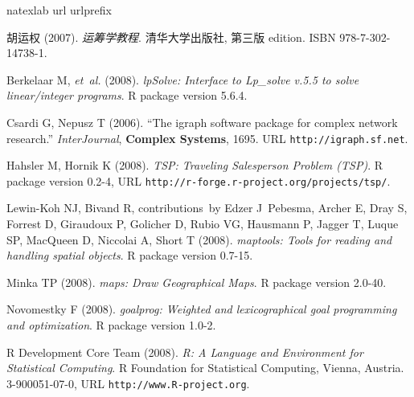 \documentclass{article}
\begin{document}
\begin{thebibliography}{20}
\newcommand{\enquote}[1]{``#1''}
\expandafter\ifx\csname natexlab\endcsname\relax\def\natexlab#1{#1}\fi
\expandafter\ifx\csname url\endcsname\relax
  \def\url#1{\texttt{#1}}\fi
\expandafter\ifx\csname urlprefix\endcsname\relax\def\urlprefix{URL }\fi
\providecommand{\eprint}[2][]{\url{#2}}

胡运权 (2007).
\newblock \emph{运筹学教程}.
\newblock 清华大学出版社, 第三版 edition.
\newblock ISBN 978-7-302-14738-1.

Berkelaar M, \emph{et~al.} (2008).
\newblock \emph{lpSolve: Interface to Lp\_solve v.5.5 to solve linear/integer
  programs}.
\newblock R package version 5.6.4.

Csardi G, Nepusz T (2006).
\newblock \enquote{The igraph software package for complex network research.}
\newblock \emph{InterJournal}, \textbf{Complex Systems}, 1695.
\newblock \urlprefix\url{http://igraph.sf.net}.

Hahsler M, Hornik K (2008).
\newblock \emph{TSP: Traveling Salesperson Problem (TSP)}.
\newblock R package version 0.2-4,
  \urlprefix\url{http://r-forge.r-project.org/projects/tsp/}.

Lewin-Koh NJ, Bivand R, contributions~by Edzer J~Pebesma, Archer E, Dray S,
  Forrest D, Giraudoux P, Golicher D, Rubio VG, Hausmann P, Jagger T, Luque SP,
  MacQueen D, Niccolai A, Short T (2008).
\newblock \emph{maptools: Tools for reading and handling spatial objects}.
\newblock R package version 0.7-15.

Minka TP (2008).
\newblock \emph{maps: Draw Geographical Maps}.
\newblock R package version 2.0-40.

Novomestky F (2008).
\newblock \emph{goalprog: Weighted and lexicographical goal programming and
  optimization}.
\newblock R package version 1.0-2.

{R Development Core Team} (2008).
\newblock \emph{R: A Language and Environment for Statistical Computing}.
\newblock R Foundation for Statistical Computing, Vienna, Austria.
 3-900051-07-0, \urlprefix\url{http://www.R-project.org}.


\end{thebibliography}
\end{document}

